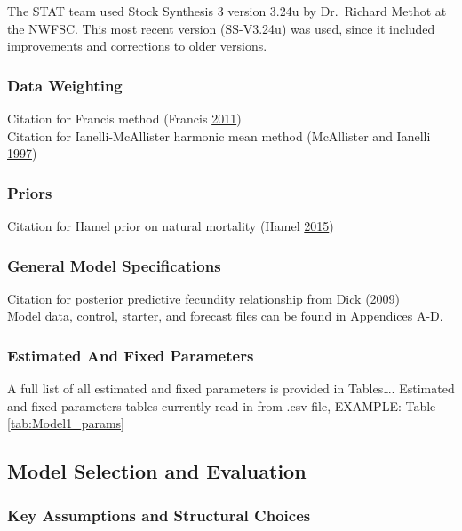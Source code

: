 \documentclass[12pt,]{article}
\begin{document}
The STAT team used Stock Synthesis 3 version 3.24u by Dr.~Richard Methot
at the NWFSC. This most recent version (SS-V3.24u) was used, since it
included improvements and corrections to older versions.

\subsubsection{Data Weighting}\label{data-weighting}

Citation for Francis method (Francis
\protect\hyperlink{ref-Francis2011}{2011})\\
Citation for Ianelli-McAllister harmonic mean method (McAllister and
Ianelli \protect\hyperlink{ref-McAllister1997}{1997})

\subsubsection{Priors}\label{priors}

Citation for Hamel prior on natural mortality (Hamel
\protect\hyperlink{ref-Hamel2015}{2015})

\subsubsection{General Model
Specifications}\label{general-model-specifications}

Citation for posterior predictive fecundity relationship from Dick
(\protect\hyperlink{ref-Dick2009}{2009})\\
Model data, control, starter, and forecast files can be found in
Appendices A-D.

\subsubsection{Estimated And Fixed
Parameters}\label{estimated-and-fixed-parameters}

A full list of all estimated and fixed parameters is provided in
Tables\ldots{}. Estimated and fixed parameters tables currently read in
from .csv file, EXAMPLE: Table \ref{tab:Model1_params}

\subsection{Model Selection and
Evaluation}\label{model-selection-and-evaluation}

\subsubsection{Key Assumptions and Structural
Choices}\label{key-assumptions-and-structural-choices}
\end{document}
